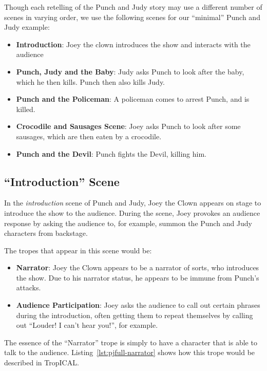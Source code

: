 \documentclass[11pt]{report}
\begin{document}
Though each retelling of the Punch and Judy story may use a different number of
scenes in varying order, we use the following scenes for our ``minimal'' Punch
and Judy example:

\begin{itemize}
\item \textbf{Introduction}: Joey the clown introduces the show and interacts
  with the audience
\item \textbf{Punch, Judy and the Baby}: Judy asks Punch to look after the baby,
  which he then kills. Punch then also kills Judy.
\item \textbf{Punch and the Policeman}: A policeman comes to arrest Punch, and
  is killed.
\item \textbf{Crocodile and Sausages Scene}: Joey asks Punch to look after some
  sausages, which are then eaten by a crocodile.
\item \textbf{Punch and the Devil}: Punch fights the Devil, killing him.
\end{itemize}

\subsection{``Introduction'' Scene}
\label{sec:full-introduction}
In the \emph{introduction} scene of Punch and Judy, Joey the Clown appears on stage to
introduce the show to the audience. During the scene, Joey provokes an audience
response by asking the audience to, for example, summon the Punch and Judy
characters from backstage.

The tropes that appear in this scene would be:

\begin{itemize}
\item \textbf{Narrator}: Joey the Clown appears to be a narrator of sorts, who
introduces the show. Due to his narrator status, he appears to be immune from
Punch's attacks.
\item \textbf{Audience Participation}: Joey asks the audience to call out certain
phrases during the introduction, often getting them to repeat themselves by
calling out ``Louder! I can't hear you!'', for example.
\end{itemize}

The essence of the ``Narrator'' trope is simply to have a character that is able
to talk to the audience. Listing~\ref{lst:pjfull-narrator} shows how this trope
would be described in TropICAL.
\end{document}
